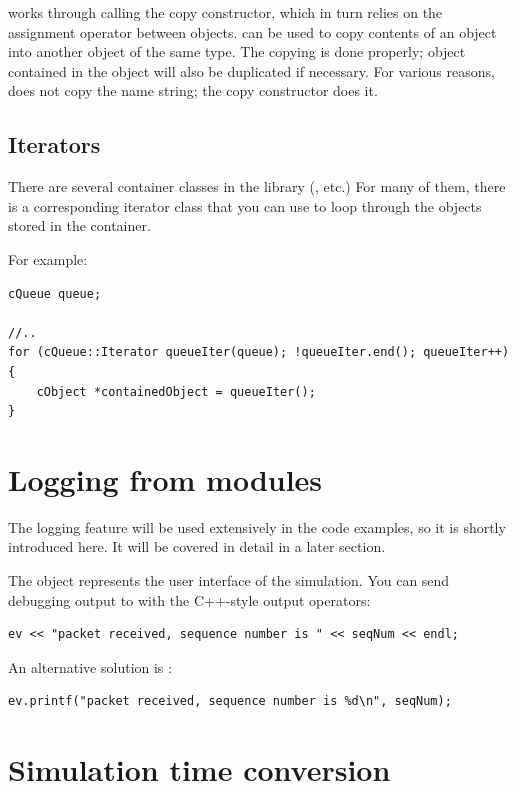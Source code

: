 works through calling the copy constructor, which in
turn relies on the assignment operator between objects.
 can be used to copy contents of an object into
another object of the same type. The copying is done properly; object
contained in the object will also be duplicated if necessary. For
various reasons,  does not copy the name string;
the copy constructor does it.


\subsection{Iterators}


There are several container classes in the library (,
 etc.) For many of them, there is a corresponding
iterator class that you can use to loop through the objects stored in
the container.

For example:

\begin{verbatim}
cQueue queue;

//..
for (cQueue::Iterator queueIter(queue); !queueIter.end(); queueIter++)
{
    cObject *containedObject = queueIter();
}
\end{verbatim}


\section{Logging from modules}

The logging feature will be used extensively in the code examples,
so it is shortly introduced here. It will be covered in detail
in a later section.

The  object represents the user interface of the
simulation.  You can send debugging output to  with the C++-style
output operators:

\begin{verbatim}
ev << "packet received, sequence number is " << seqNum << endl;
\end{verbatim}

An alternative solution is :

\begin{verbatim}
ev.printf("packet received, sequence number is %d\n", seqNum);
\end{verbatim}

\section{Simulation time conversion}

